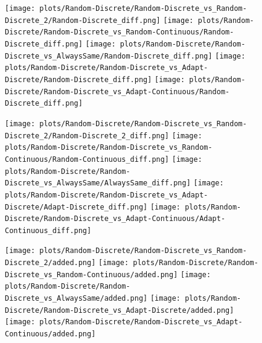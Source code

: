 \documentclass{article}
\begin{document}
\begin{figure}[!h]
	\centering
	\begin{minipage}[c]{0.1\textwidth}
		\raggedleft
	\end{minipage}
	\begin{minipage}[c]{0.80\textwidth}
		\texttt{[image: plots/Random-Discrete/Random-Discrete\_vs\_Random-Discrete\_2/Random-Discrete\_diff.png]}\hfill
		\texttt{[image: plots/Random-Discrete/Random-Discrete\_vs\_Random-Continuous/Random-Discrete\_diff.png]}\hfill
		\texttt{[image: plots/Random-Discrete/Random-Discrete\_vs\_AlwaysSame/Random-Discrete\_diff.png]}\hfill
		\texttt{[image: plots/Random-Discrete/Random-Discrete\_vs\_Adapt-Discrete/Random-Discrete\_diff.png]}\hfill
		\texttt{[image: plots/Random-Discrete/Random-Discrete\_vs\_Adapt-Continuous/Random-Discrete\_diff.png]}\hfill
\end{minipage}
\end{figure}
\begin{figure}[!h]
	\centering
	\begin{minipage}[c]{0.1\textwidth}
		\raggedleft
	\end{minipage}
	\begin{minipage}[c]{0.80\textwidth}
		\texttt{[image: plots/Random-Discrete/Random-Discrete\_vs\_Random-Discrete\_2/Random-Discrete\_2\_diff.png]}\hfill
		\texttt{[image: plots/Random-Discrete/Random-Discrete\_vs\_Random-Continuous/Random-Continuous\_diff.png]}\hfill
		\texttt{[image: plots/Random-Discrete/Random-Discrete\_vs\_AlwaysSame/AlwaysSame\_diff.png]}\hfill
		\texttt{[image: plots/Random-Discrete/Random-Discrete\_vs\_Adapt-Discrete/Adapt-Discrete\_diff.png]}\hfill
		\texttt{[image: plots/Random-Discrete/Random-Discrete\_vs\_Adapt-Continuous/Adapt-Continuous\_diff.png]}\hfill
\end{minipage}
\end{figure}
\begin{figure}[!h]
	\centering
	\begin{minipage}[c]{0.1\textwidth}
		\raggedleft
	\end{minipage}
	\begin{minipage}[c]{0.80\textwidth}
		\texttt{[image: plots/Random-Discrete/Random-Discrete\_vs\_Random-Discrete\_2/added.png]}\hfill
		\texttt{[image: plots/Random-Discrete/Random-Discrete\_vs\_Random-Continuous/added.png]}\hfill
		\texttt{[image: plots/Random-Discrete/Random-Discrete\_vs\_AlwaysSame/added.png]}\hfill
		\texttt{[image: plots/Random-Discrete/Random-Discrete\_vs\_Adapt-Discrete/added.png]}\hfill 
		\texttt{[image: plots/Random-Discrete/Random-Discrete\_vs\_Adapt-Continuous/added.png]}\hfill
	\end{minipage}
\end{figure}
\end{document}
